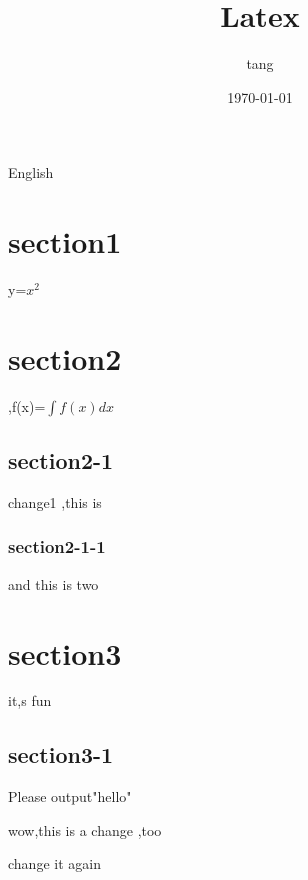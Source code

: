 \documentclass{article}
\begin{document}
	\title{Latex}
	\author{tang}
	\date{\today}
	\maketitle
	English
	\tableofcontents
	\section{section1}
     y=$x^2$
	\section{section2}
,f(x)=$\int f(x)dx$
	\subsection{section2-1}
     change1 ,this is
	\subsubsection{section2-1-1}
	and this is two
	\section{section3}
    it,s fun
	\subsection{section3-1}

    Please output"hello" \par
    wow,this is a change ,too \par
    change it again
\end{document}
